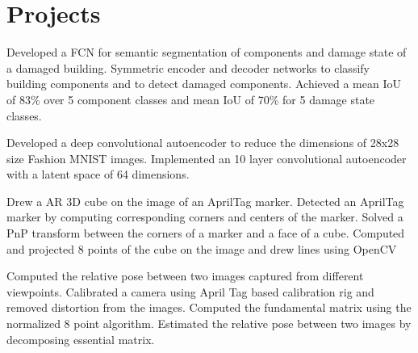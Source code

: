 \section{Projects}
\resumeSubHeadingListStart

\resumeItemListStart
{}
{Developed a FCN for semantic segmentation of components and damage state of a damaged building.}
{Symmetric encoder and decoder networks to classify building components and to detect damaged components.}
{Achieved a mean IoU of 83\% over 5 component classes and mean IoU of 70\% for 5 damage state classes.}
\resumeItemListEnd

\resumeItemListStart
{}
{Developed a deep convolutional autoencoder to reduce the dimensions of 28x28 size Fashion MNIST images.}
{Implemented an 10 layer convolutional autoencoder with a latent space of 64 dimensions.}
\resumeItemListEnd

\resumeItemListStart
{}
{Drew a AR 3D cube on the image of an AprilTag marker.}
{Detected an AprilTag marker by computing corresponding corners and centers of the marker.}
{Solved a PnP transform between the corners of a marker and a face of a cube.}
{Computed and projected 8 points of the cube on the image and drew lines using OpenCV}
\resumeItemListEnd

\resumeItemListStart
{}
{Computed the relative pose between two images captured from different viewpoints.}
{Calibrated a camera using April Tag based calibration rig and removed distortion from the images.}
{Computed the fundamental matrix using the normalized 8 point algorithm.}
{Estimated the relative pose between two images by decomposing essential matrix.}
\resumeItemListEnd

